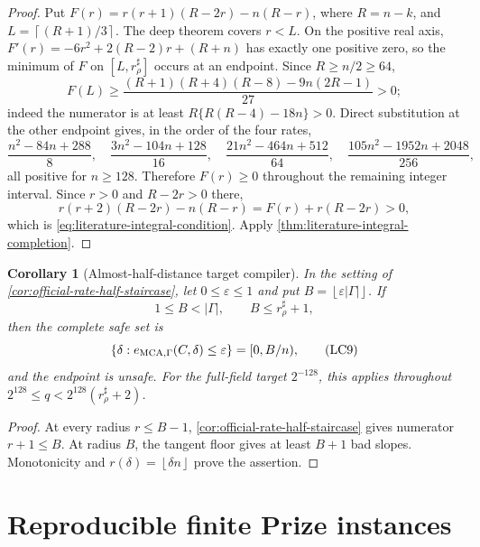 \documentclass[11pt,a4paper]{amsart}
\numberwithin{equation}{section}
\newtheorem{corollary}[corollary]{Corollary}
\theoremstyle{remark}
\newcommand{\eps}{\varepsilon}
\newcommand{\abs}[1]{\lvert #1\rvert}
\newcommand{\floor}[1]{\left\lfloor #1\right\rfloor}
\newcommand{\ceil}[1]{\left\lceil #1\right\rceil}
\begin{document}
\begin{proof}
Put \(F(r)=r(r+1)(R-2r)-n(R-r)\), where \(R=n-k\), and
\(L=\ceil{(R+1)/3}\).  The deep theorem covers \(r<L\).  On the
positive real axis, \(F'(r)=-6r^2+2(R-2)r+(R+n)\) has exactly one
positive zero, so the minimum of \(F\) on \([L,r_\rho^\sharp]\) occurs
at an endpoint.  Since \(R\ge n/2\ge64\),
\[
 F(L)\ge
 \frac{(R+1)(R+4)(R-8)-9n(2R-1)}{27}>0;
\]
indeed the numerator is at least
\(R\{R(R-4)-18n\}>0\).  Direct substitution at the other endpoint gives,
in the order of the four rates,
\[
 \frac{n^2-84n+288}{8},\quad
 \frac{3n^2-104n+128}{16},\quad
 \frac{21n^2-464n+512}{64},\quad
 \frac{105n^2-1952n+2048}{256},
\]
all positive for \(n\ge128\).  Therefore \(F(r)\ge0\) throughout the
remaining integer interval.  Since \(r>0\) and \(R-2r>0\) there,
\[
 r(r+2)(R-2r)-n(R-r)=F(r)+r(R-2r)>0,
\]
which is \eqref{eq:literature-integral-condition}.  Apply
\cref{thm:literature-integral-completion}.
\end{proof}

\begin{corollary}[Almost-half-distance target compiler]
\label{cor:half-distance-window-compiler}
In the setting of \cref{cor:official-rate-half-staircase}, let
\(0\le\eps\le1\) and put
\(B=\floor{\eps\abs\Gamma}\).  If
\[
 1\le B<\abs\Gamma,\qquad B\le r_\rho^\sharp+1,
\]
then the complete safe set is
\[
 \{\delta:e_{\rm MCA,\Gamma}(C,\delta)\le\eps\}
       =[0,B/n),                                   \tag{LC9}
 \label{eq:half-distance-safe-set}
\]
and the endpoint is unsafe.  For the full-field target \(2^{-128}\),
this applies throughout
\(2^{128}\le q<2^{128}(r_\rho^\sharp+2)\).
\end{corollary}

\begin{proof}
At every radius \(r\le B-1\),
\cref{cor:official-rate-half-staircase} gives numerator
\(r+1\le B\).  At radius \(B\), the tangent floor gives at least
\(B+1\) bad slopes.  Monotonicity and
\(r(\delta)=\floor{\delta n}\) prove the assertion.
\end{proof}


\section{Reproducible finite Prize instances}\label{sec:prize-rows}
\end{document}
